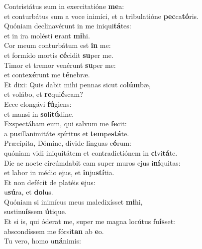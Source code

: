 \evenverse Contristátus sum in exercitatióne \textbf{me}a:~\*\\
\evenverse et conturbátus sum a voce inimíci, et a tribulatióne \textbf{pec}ca\textbf{tó}ris.\\
\oddverse Quóniam declinavérunt in me iniqui\textbf{tá}tes:~\*\\
\oddverse et in ira molésti \textbf{e}rant \textbf{mi}hi.\\
\evenverse Cor meum conturbátum est \textbf{in} me:~\*\\
\evenverse et formído mortis \textbf{cé}cidit \textbf{su}per me.\\
\oddverse Timor et tremor venérunt \textbf{su}per me:~\*\\
\oddverse et conte\textbf{xé}runt me \textbf{té}nebræ.\\
\evenverse Et dixi: Quis dabit mihi pennas sicut co\textbf{lúm}bæ,~\*\\
\evenverse et volábo, et \textbf{re}qui\textbf{é}scam?\\
\oddverse Ecce elongávi \textbf{fú}giens:~\*\\
\oddverse et mansi in \textbf{so}li\textbf{tú}dine.\\
\evenverse Exspectábam eum, qui salvum me \textbf{fe}cit:~\*\\
\evenverse a pusillanimitáte spíritus et \textbf{tem}pe\textbf{stá}te.\\
\oddverse Præcípita, Dómine, dívide linguas e\textbf{ó}rum:~\*\\
\oddverse quóniam vidi iniquitátem et contradictiónem in \textbf{ci}vi\textbf{tá}te.\\
\evenverse Die ac nocte circúmdabit eam super muros ejus i\textbf{ní}quitas:~\*\\
\evenverse et labor in médio ejus, et \textbf{in}ju\textbf{stí}tia.\\
\oddverse Et non defécit de platéis \textbf{e}jus:~\*\\
\oddverse u\textbf{sú}ra, et \textbf{do}lus.\\
\evenverse Quóniam si inimícus meus maledixísset \textbf{mi}hi,~\*\\
\evenverse sustinu\textbf{ís}sem \textbf{ú}tique.\\
\oddverse Et si is, qui óderat me, super me magna locútus fu\textbf{ís}set:~\*\\
\oddverse abscondíssem me fórsi\textbf{tan} ab \textbf{e}o.\\
\evenverse Tu vero, homo u\textbf{ná}nimis:~\*\\
